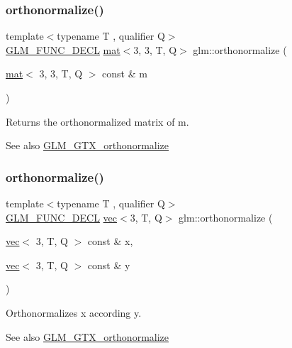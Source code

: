 \subsubsection{\texorpdfstring{orthonormalize()}{orthonormalize()}\hspace{0.1cm}{\footnotesize\ttfamily [1/2]}}
{\footnotesize\ttfamily template$<$typename T , qualifier Q$>$ \\
\mbox{\hyperlink{setup_8hpp_ab2d052de21a70539923e9bcbf6e83a51}{G\+L\+M\+\_\+\+F\+U\+N\+C\+\_\+\+D\+E\+CL}} \mbox{\hyperlink{structglm_1_1mat}{mat}}$<$3, 3, T, Q$>$ glm\+::orthonormalize (\begin{DoxyParamCaption}\item[{\mbox{\hyperlink{structglm_1_1mat}{mat}}$<$ 3, 3, T, Q $>$ const \&}]{m }\end{DoxyParamCaption})}

Returns the orthonormalized matrix of m.

\begin{DoxySeeAlso}{See also}
\mbox{\hyperlink{group__gtx__orthonormalize}{G\+L\+M\+\_\+\+G\+T\+X\+\_\+orthonormalize}} 
\end{DoxySeeAlso}
\mbox{\label{group__gtx__orthonormalize_gac3bc7ef498815026bc3d361ae0b7138e}} 
\subsubsection{\texorpdfstring{orthonormalize()}{orthonormalize()}\hspace{0.1cm}{\footnotesize\ttfamily [2/2]}}
{\footnotesize\ttfamily template$<$typename T , qualifier Q$>$ \\
\mbox{\hyperlink{setup_8hpp_ab2d052de21a70539923e9bcbf6e83a51}{G\+L\+M\+\_\+\+F\+U\+N\+C\+\_\+\+D\+E\+CL}} \mbox{\hyperlink{structglm_1_1vec}{vec}}$<$3, T, Q$>$ glm\+::orthonormalize (\begin{DoxyParamCaption}\item[{\mbox{\hyperlink{structglm_1_1vec}{vec}}$<$ 3, T, Q $>$ const \&}]{x,  }\item[{\mbox{\hyperlink{structglm_1_1vec}{vec}}$<$ 3, T, Q $>$ const \&}]{y }\end{DoxyParamCaption})}

Orthonormalizes x according y.

\begin{DoxySeeAlso}{See also}
\mbox{\hyperlink{group__gtx__orthonormalize}{G\+L\+M\+\_\+\+G\+T\+X\+\_\+orthonormalize}} 
\end{DoxySeeAlso}
